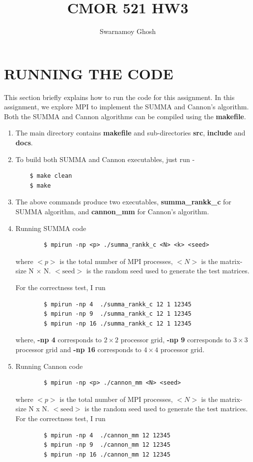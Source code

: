 \documentclass{article}[12pt]
\title{CMOR 521 HW3}
\author{Swarnamoy Ghosh}
\date{}
\begin{document}
\maketitle

\section{RUNNING THE CODE}

This section briefly explains how to run the code for this assignment. In this assignment, we explore MPI to implement the SUMMA and Cannon's algorithm. Both the SUMMA and Cannon algorithms can be compiled using the \textbf{makefile}.

\begin{enumerate}
    \item The main directory contains \textbf{makefile} and sub-directories \textbf{src}, \textbf{include} and \textbf{docs}.
    \item  To build both SUMMA and Cannon executables, just run -
    \begin{verbatim}
    $ make clean
    $ make
    \end{verbatim}
    \item The above commands produce two executables, \textbf{summa\_rankk\_c} for SUMMA algorithm, and \textbf{cannon\_mm} for Cannon's algorithm.
    \item Running SUMMA code
    \begin{verbatim}
        $ mpirun -np <p> ./summa_rankk_c <N> <k> <seed>
    \end{verbatim}
    where $<p>$ is the total number of MPI processes, $<N>$ is the matrix-size N $\times$ N. $<\text{seed}>$ is the random seed used to generate the test matrices.

    For the correctness test, I run
    \begin{verbatim}
        $ mpirun -np 4  ./summa_rankk_c 12 1 12345
        $ mpirun -np 9  ./summa_rankk_c 12 1 12345
        $ mpirun -np 16 ./summa_rankk_c 12 1 12345
    \end{verbatim}
    where, \textbf{-np 4} corresponds to $2 \times 2$ processor grid, \textbf{-np 9} corresponds to $3 \times 3$ processor grid and \textbf{-np 16} corresponds to $4 \times 4$ processor grid.
    \item Running Cannon code
    \begin{verbatim}
        $ mpirun -np <p> ./cannon_mm <N> <seed>
    \end{verbatim}
    where $<p>$ is the total number of MPI processes, $<N>$ is the matrix-size N x N. $<\text{seed}>$ is the random seed used to generate the test matrices.
    For the correctness test, I run
    \begin{verbatim}
        $ mpirun -np 4  ./cannon_mm 12 12345
        $ mpirun -np 9  ./cannon_mm 12 12345
        $ mpirun -np 16 ./cannon_mm 12 12345
    \end{verbatim}
\end{enumerate}
\end{document}
